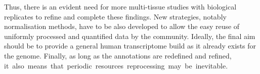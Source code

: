 Thus, there is an evident need for more multi-tissue studies
with biological replicates to refine and complete these findings.
New strategies, notably normalisation methods, have to be also developed
to allow the easy reuse of uniformly processed and quantified data by
the community.
Ideally, the final aim should be to provide a general human transcriptome build
as it already exists for the genome.
Finally, as long as the annotations are redefined and refined,
it~also~means~that~periodic~resources~reprocessing~may~be~inevitable.

